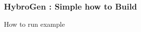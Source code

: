 \begin{frame}\frametitle{HybroGen : Simple how to Build}
  \begin{block}{How to run example}
  
\end{block}
\end{frame}
